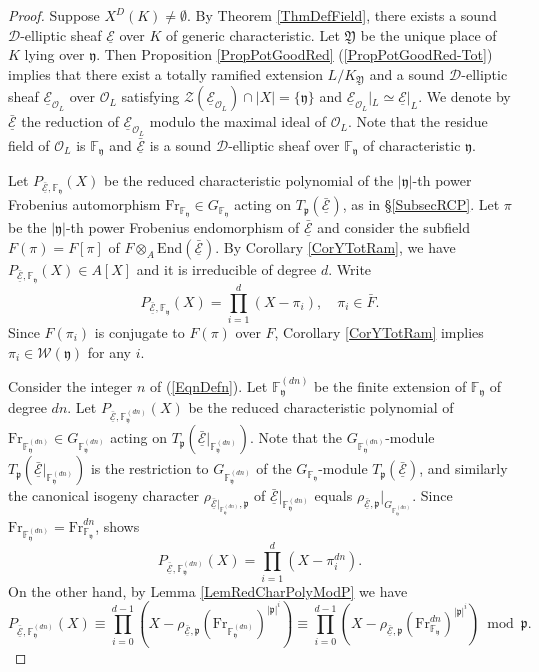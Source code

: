 \documentclass[10pt]{amsart}
\theoremstyle{plain}
\theoremstyle{definition}
\newcommand{\End}{\mathrm{End}}
\newcommand{\Fr}{\mathrm{Fr}}
\newcommand{\cO}{\mathcal{O}}
\newcommand{\cW}{\mathcal{W}}
\newcommand{\cZ}{\mathcal{Z}}
\newcommand{\ucE}{\underline{\mathcal{E}}}
\newcommand{\bF}{\mathbb{F}}
\newcommand{\sD}{\mathscr{D}}
\newcommand{\frp}{\mathfrak{p}}
\newcommand{\frY}{\mathfrak{Y}}
\newcommand{\fry}{\mathfrak{y}}
\begin{document}
\begin{proof}
	Suppose $X^D(K)\neq\emptyset$. 
	By Theorem \ref{ThmDefField}, there exists a sound $\sD$-elliptic sheaf $\ucE$ over $K$ 
	of generic characteristic.
	Let $\frY$ be the unique place of $K$ lying over $\fry$. Then Proposition \ref{PropPotGoodRed} (\ref{PropPotGoodRed-Tot}) implies 
	that there exist a totally ramified 
	extension $L/K_{\frY}$ and a sound $\sD$-elliptic sheaf $\ucE_{\cO_L}$ over $\cO_L$ satisfying
	$\cZ(\ucE_{\cO_L})\cap|X|=\{\fry\}$ and $\ucE_{\cO_L}|_L\simeq \ucE|_L$. 
	We denote by $\bar{\ucE}$ the reduction of $\ucE_{\cO_L}$ 
	modulo the maximal ideal of $\cO_L$. 
	Note that the residue field of $\cO_L$ is $\bF_\fry$ and $\bar{\ucE}$ is a sound $\sD$-elliptic sheaf over $\bF_\fry$
	of characteristic $\fry$.
	
	Let $P_{\bar{\ucE},\bF_\fry}(X)$ be the reduced characteristic polynomial of the $|\fry|$-th power Frobenius automorphism 
	$\Fr_{\bF_\fry}\in G_{\bF_\fry}$
	acting on $T_\frp(\bar{\ucE})$, as in 
	\S\ref{SubsecRCP}.
	Let $\pi$ be the $|\fry|$-th power Frobenius endomorphism of $\bar{\ucE}$ and consider the subfield $F(\pi)=F[\pi]$ of $F\otimes_A\End(\bar{\ucE})$.
	By Corollary \ref{CorYTotRam}, we have 
	$P_{\bar{\ucE},\bF_\fry}(X)\in A[X]$ and it is irreducible of degree $d$.
	Write
	\[
	P_{\bar{\ucE},\bF_\fry}(X)=\prod_{i=1}^d (X-\pi_i),\quad \pi_i\in \bar{F}.
	\]
	Since $F(\pi_i)$ is conjugate to $F(\pi)$ over $F$, 
	Corollary \ref{CorYTotRam} implies $\pi_i\in \cW(\fry)$ for any $i$.
	
	Consider the integer $n$ of (\ref{EqnDefn}).
	Let $\bF_\fry^{(dn)}$ be the finite extension of $\bF_\fry$ of degree $d n$.
	Let $P_{\bar{\ucE},\bF_\fry^{(dn)}}(X)$ be the reduced characteristic polynomial
	of $\Fr_{\bF_\fry^{(dn)}}\in G_{\bF_\fry^{(dn)}}$ acting on $T_\frp(\bar{\ucE}|_{\bF_\fry^{(dn)}})$.
	Note that the $G_{\bF_\fry^{(dn)}}$-module $T_\frp(\bar{\ucE}|_{\bF_\fry^{(dn)}})$ 
	is the restriction to $G_{\bF_\fry^{(dn)}}$ of the $G_{\bF_\fry}$-module $T_\frp(\bar{\ucE})$,
	and similarly the canonical isogeny character $\rho_{\bar{\ucE}|_{\bF_\fry^{(dn)}},\frp}$
	of $\bar{\ucE}|_{\bF_\fry^{(dn)}}$ equals $\rho_{\bar{\ucE},\frp}|_{G_{\bF_\fry^{(dn)}}}$.
	Since $\Fr_{\bF_\fry^{(dn)}}=\Fr_{\bF_\fry}^{dn}$, \cite[Theorem 9.5]{Rei} shows
	\[
	P_{\bar{\ucE},\bF_\fry^{(dn)}}(X)=\prod_{i=1}^d (X-\pi_i^{dn}).
	\]
	On the other hand, by Lemma \ref{LemRedCharPolyModP} we have
	\[
	P_{\bar{\ucE},\bF_\fry^{(dn)}}(X)\equiv \prod_{i=0}^{d-1}\left(X-\rho_{\bar{\ucE},\frp}(\Fr_{\bF_\fry^{(dn)}})^{|\frp|^i}\right)
	\equiv\prod_{i=0}^{d-1}\left(X-\rho_{\bar{\ucE},\frp}(\Fr_{\bF_\fry}^{dn})^{|\frp|^i}\right) \bmod \frp.
	\]
	

\end{proof}
\end{document}
